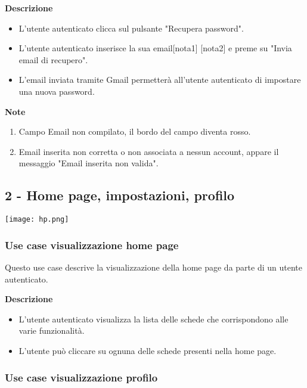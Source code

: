 \documentclass[a4paper,12pt]{article}
\begin{document}
\textbf{Descrizione}
\begin{itemize} \setlength\itemsep{0.01em}
\item L'utente autenticato clicca sul pulsante "Recupera password".
\item L'utente autenticato inserisce la sua email[nota1] [nota2] e preme su "Invia email di recupero".
\item L'email inviata tramite Gmail permetterà all'utente autenticato di impostare una nuova password.
\end{itemize}

\textbf{Note}
\begin{enumerate} \setlength\itemsep{0.01em}
\item Campo Email non compilato, il bordo del campo diventa rosso.
\item Email inserita non corretta o non associata a nessun account, appare il messaggio "Email inserita non valida".
\end{enumerate}


\subsection*{2 - Home page, impostazioni, profilo}
\begin{center}
  \texttt{[image: hp.png]}
\end{center}


\subsubsection*{Use case visualizzazione home page}

Questo use case descrive la visualizzazione della home page da parte di un utente autenticato.

\textbf{Descrizione}
\begin{itemize} \setlength\itemsep{0.01em}
\item L'utente autenticato visualizza la lista delle schede che corrispondono alle varie funzionalità.
\item L'utente può cliccare su ognuna delle schede presenti nella home page.
\end{itemize}


\subsubsection*{Use case visualizzazione profilo}
\end{document}
